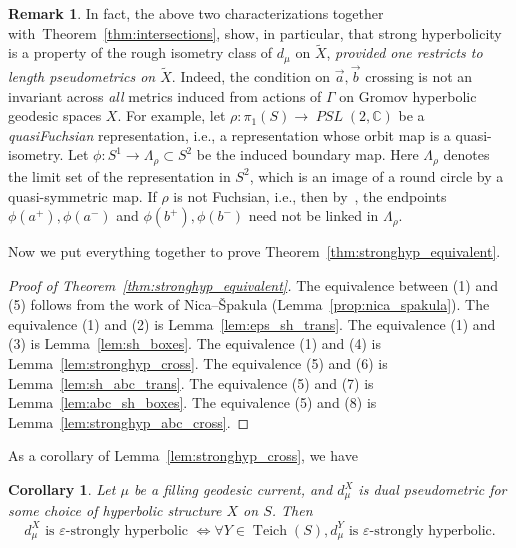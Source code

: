 \documentclass[12pt]{amsart}
\numberwithin{equation}{section}
\numberwithin{figure}{section}
\newtheorem{corollary}[equation]{Corollary}
\theoremstyle{definition}
\newtheorem{remark}[equation]{Remark}
\theoremstyle{plain}
\DeclareMathOperator{\Teich}{Teich}
\newcommand{\ora}[1]{\overrightarrow{#1}}
\newcommand*{\wt}[1]{\widetilde{#1}}
\renewcommand{\epsilon}{\varepsilon}
\DeclareMathOperator{\PSL}{\mathit{PSL}}
\begin{document}
\begin{remark}\label{rmk:roughisometry}
In fact, the above two characterizations together with~Theorem~\ref{thm:intersections}, show, in particular, that strong hyperbolicity is a property of the rough isometry class of $d_\mu$ on $\wt{X}$, \emph{provided one restricts to length pseudometrics on $\wt{X}$}.
Indeed, the condition on $\ora{a},\ora{b}$ crossing  is not an invariant across \emph{all} metrics induced from actions of $\Gamma$ on Gromov hyperbolic geodesic spaces $X$.
For example, let $\rho \colon \pi_1(S) \to \PSL(2,\mathbb{C})$ be a \emph{quasiFuchsian} representation, i.e., a representation whose orbit map is a quasi-isometry.
Let $\phi \colon S^1 \to \Lambda_\rho \subset S^2$ be the induced boundary map. Here $\Lambda_\rho$ denotes the limit set of the representation in $S^2$, which is an image of a round circle by a quasi-symmetric map.
If $\rho$ is not Fuchsian, i.e., then by~\cite[Proposition~3.2]{FF22:Quasifuchsian}, the endpoints $\phi(a^+), \phi(a^-)$ and $\phi(b^+),\phi(b^-)$ need not be linked in $\Lambda_\rho$.
\end{remark}
Now we put everything together to prove Theorem~\ref{thm:stronghyp_equivalent}.

\begin{proof}[Proof of Theorem~\ref{thm:stronghyp_equivalent}]
The equivalence between (1) and (5) follows from the work of Nica--\v{S}pakula (Lemma~\ref{prop:nica_spakula}). 
The equivalence (1) and (2) is Lemma~\ref{lem:eps_sh_trans}.
The equivalence (1) and (3) is Lemma~\ref{lem:sh_boxes}.
The equivalence (1) and (4) is Lemma~\ref{lem:stronghyp_cross}.
The equivalence (5) and (6) is Lemma~\ref{lem:sh_abc_trans}.
The equivalence (5) and (7) is Lemma~\ref{lem:abc_sh_boxes}.
The equivalence (5) and (8) is Lemma~\ref{lem:stronghyp_abc_cross}.
\end{proof}

As a corollary of Lemma~\ref{lem:stronghyp_cross}, we have

\begin{corollary}
Let $\mu$ be a filling geodesic current, and $d_\mu^X$ is dual pseudometric for some choice of hyperbolic structure $X$ on $S$. Then
\[
d_\mu^X \text{ is } \epsilon\text{-strongly hyperbolic }
\iff
\forall Y \in \Teich(S), d_\mu^Y \text{ is } \epsilon\text{-strongly hyperbolic}.
\]
\label{cor:stronghyp_roughsimilar}
\end{corollary}
\end{document}
